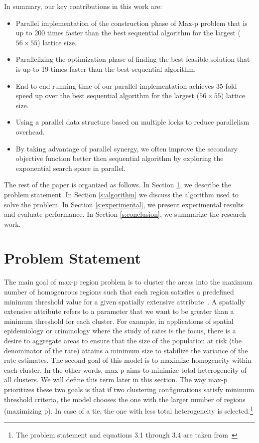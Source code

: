 \documentclass[conference]{IEEEtran}
\begin{document}
In summary, our key contributions in this work are:
\begin{itemize}

\item Parallel implementation of the construction phase of Max-p problem that is up to 200 times faster than the best sequential algorithm for the largest ($56\times 55$) lattice size.

\item Parallelizing the optimization phase of finding the best feasible solution that is up to 19 times faster than the best sequential algorithm.

\item End to end running time of our parallel implementation achieves 35-fold speed up over the best sequential algorithm for the largest ($56\times 55$) lattice size.

\item Using a parallel data structure based on multiple locks to reduce parallelism overhead.

\item By taking advantage of parallel synergy, we often improve the secondary objective function better then sequential algorithm by exploring the exponential search space in parallel.

\end{itemize}

The rest of the paper is organized as follows. In Section \ref{s:problem}, we
 describe the problem statement. In
Section \ref{s:algorithm} we discuss the algorithm used to solve the problem. In Section \ref{s:experimental}, we
present experimental results and evaluate performance. In Section \ref{s:conclusion}, we
summarize the research work.


\section{Problem Statement}\label{s:problem}
The main goal of max-p region problem is to cluster the areas into the maximum number of
homogeneous regions such that each region satisfies a predefined minimum
threshold value for a given spatially extensive attribute~\cite{r1}. A spatially extensive
attribute refers to a parameter that we want to be greater than a minimum
threshold for each cluster. For example, in applications of spatial epidemiology
or criminology where the study of rates is the focus, there is a desire to
aggregate areas to ensure that the size of the population at risk (the
denominator of the rate) attains a minimum size to stabilize the variance of the
rate estimates. The second goal of this model is to maximize 
homogeneity within each cluster. In the other words, max-p aims to minimize total
heterogeneity of all clusters. We will define this term later in this section.
The way max-p prioritizes these two goals is that if two clustering
configurations satisfy minimum threshold criteria, the model chooses the one
with the larger number of regions (maximizing p). In case of a tie, the one with less
total heterogeneity is selected.\footnote{The problem statement and equations 3.1 through 3.4 are taken from~\cite{r1}}
\end{document}
